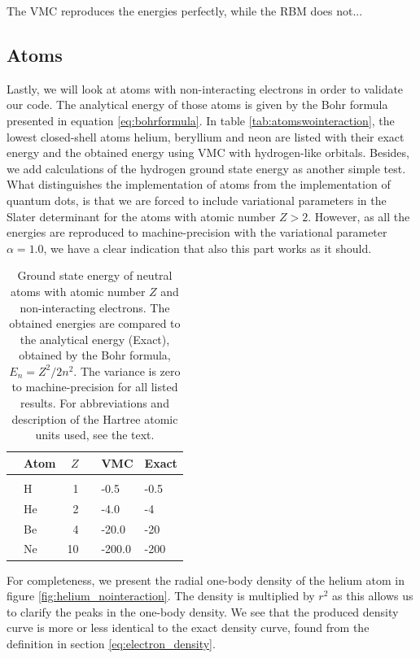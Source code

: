 The VMC reproduces the energies perfectly, while the RBM does not...
\fi

\subsection{Atoms}
Lastly, we will look at atoms with non-interacting electrons in order to validate our code. The analytical energy of those atoms is given by the Bohr formula presented in equation \eqref{eq:bohrformula}. In table \eqref{tab:atomswointeraction}, the lowest closed-shell atoms helium, beryllium and neon are listed with their exact energy and the obtained energy using VMC with hydrogen-like orbitals. Besides, we add calculations of the hydrogen ground state energy as another simple test. What distinguishes the implementation of atoms from the implementation of quantum dots, is that we are forced to include variational parameters in the Slater determinant for the atoms with atomic number $Z>2$. However, as all the energies are reproduced to machine-precision with the variational parameter $\alpha=1.0$, we have a clear indication that also this part works as it should.

\begin{table}
	\caption{Ground state energy of neutral atoms with atomic number $Z$ and non-interacting electrons. The obtained energies are compared to the analytical energy (Exact), obtained by the Bohr formula, $E_n=Z^2/2n^2$. The variance is zero to machine-precision for all listed results. For abbreviations and description of the Hartree atomic units used, see the text.}
	\label{tab:atomswointeraction}
	\begin{tabularx}{\textwidth}{R{3.5cm}lrrR{2.5cm}R{2.5cm}} \hline\hline
		& Atom & $Z$ & \makecell{\\ \phantom{=}} & VMC & Exact \\ \hline \\
		
		& H & 1 && -0.5 & -0.5 \\
		& He & 2 && -4.0 & -4 \\
		& Be & 4 && -20.0 & -20 \\
		& Ne & 10 && -200.0 & -200 \\ \hline\hline
	\end{tabularx}
\end{table}

For completeness, we present the radial one-body density of the helium atom in figure \eqref{fig:helium_nointeraction}. The density is multiplied by $r^2$ as this allows us to clarify the peaks in the one-body density. We see that the produced density curve is more or less identical to the exact density curve, found from the definition in section \ref{eq:electron_density}.

